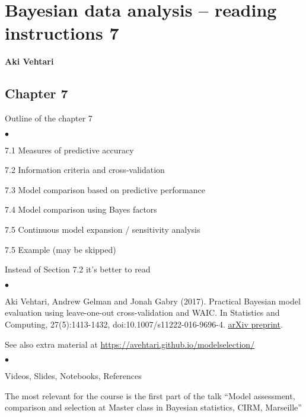 \documentclass[a4paper,11pt,english]{article}
\begin{document}
\thispagestyle{empty}

\section*{Bayesian data analysis -- reading instructions 7} 
\smallskip
{\bf Aki Vehtari}

\smallskip

\subsection*{Chapter 7}

Outline of the chapter 7
\begin{list}{$\bullet$}{\parsep=0pt\itemsep=2pt}
\item 7.1 Measures of predictive accuracy
\item 7.2 Information criteria and cross-validation
\item 7.3 Model comparison based on predictive performance
\item 7.4 Model comparison using Bayes factors
\item 7.5 Continuous model expansion / sensitivity analysis
\item 7.5 Example (may be skipped)
\end{list}

\noindent
Instead of Section 7.2 it's better to read
\begin{list}{$\bullet$}{\parsep=0pt\itemsep=2pt}
\item Aki Vehtari, Andrew Gelman and Jonah Gabry (2017). Practical
  Bayesian model evaluation using leave-one-out cross-validation and
  WAIC. In Statistics and Computing, 27(5):1413-1432,
  doi:10.1007/s11222-016-9696-4. \href{http://arxiv.org/abs/1507.04544}{arXiv
    preprint}.
\end{list}

\noindent
See also  extra material at \url{https://avehtari.github.io/modelselection/}
\begin{list}{$\bullet$}{\parsep=0pt\itemsep=2pt}
\item Videos, Slides, Notebooks, References
\item The most relevant for the course is the first part of the
  talk ``Model assessment, comparison and selection at Master
  class in Bayesian statistics, CIRM, Marseille''
\end{list}

\end{document}

